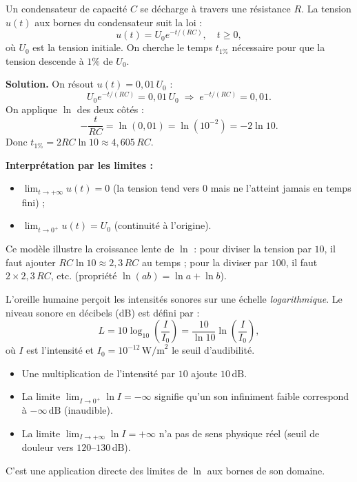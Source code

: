 \documentclass[11pt]{article}
\begin{document}
\begin{exoresolu}
Un condensateur de capacité $C$ se décharge à travers une résistance $R$. La tension $u(t)$ aux bornes du condensateur suit la loi :
\[
u(t) = U_0 e^{-t/(RC)},\quad t\ge 0,
\]
où $U_0$ est la tension initiale. On cherche le temps $t_{1\%}$ nécessaire pour que la tension descende à $1\%$ de $U_0$.

\textbf{Solution.}
On résout $u(t) = 0,01\,U_0$ :
\[
U_0 e^{-t/(RC)} = 0,01\,U_0 \;\Longrightarrow\; e^{-t/(RC)} = 0,01.
\]
On applique $\ln$ des deux côtés :
\[
-\frac{t}{RC} = \ln(0,01) = \ln(10^{-2}) = -2\ln 10.
\]
Donc $t_{1\%} = 2RC\ln 10 \approx 4,605\,RC$.

\textbf{Interprétation par les limites :}
\begin{itemize}
    \item $\displaystyle\lim_{t\to +\infty} u(t) = 0$ (la tension tend vers $0$ mais ne l'atteint jamais en temps fini) ;
    \item $\displaystyle\lim_{t\to 0^+} u(t) = U_0$ (continuité à l'origine).
\end{itemize}
Ce modèle illustre la croissance lente de $\ln$ : pour diviser la tension par $10$, il faut ajouter $RC\ln 10 \approx 2,3\,RC$ au temps ; pour la diviser par $100$, il faut $2\times 2,3\,RC$, etc. (propriété $\ln(ab)=\ln a+\ln b$).
\end{exoresolu}

\begin{savaistu}
L'oreille humaine perçoit les intensités sonores sur une échelle \emph{logarithmique}. Le niveau sonore en décibels (dB) est défini par :
\[
L = 10 \log_{10}\left(\frac{I}{I_0}\right) = \frac{10}{\ln 10} \ln\left(\frac{I}{I_0}\right),
\]
où $I$ est l'intensité et $I_0=10^{-12}\,\text{W/m}^2$ le seuil d'audibilité.
\begin{itemize}
    \item Une multiplication de l'intensité par $10$ ajoute $10\,\text{dB}$.
    \item La limite $\lim_{I\to 0^+} \ln I = -\infty$ signifie qu'un son infiniment faible correspond à $-\infty\,\text{dB}$ (inaudible).
    \item La limite $\lim_{I\to +\infty} \ln I = +\infty$ n'a pas de sens physique réel (seuil de douleur vers $120\text{--}130\,\text{dB}$).
\end{itemize}
C'est une application directe des limites de $\ln$ aux bornes de son domaine.
\end{savaistu}
\end{document}
